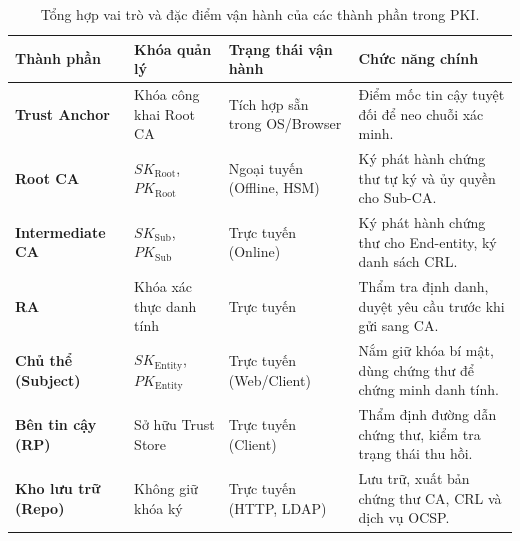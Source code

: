 \begin{table}[!htbp]
\centering
\small
\renewcommand{\arraystretch}{1.25}
\begin{tabularx}{\textwidth}{>{\raggedright\arraybackslash}p{2.6cm}>{\raggedright\arraybackslash}p{3.1cm}>{\raggedright\arraybackslash}p{2.7cm}>{\raggedright\arraybackslash}X}
\toprule
\textbf{Thành phần} & \textbf{Khóa quản lý} & \textbf{Trạng thái vận hành} & \textbf{Chức năng chính} \\
\midrule
\textbf{Trust Anchor} & Khóa công khai Root CA & Tích hợp sẵn trong OS/Browser & Điểm mốc tin cậy tuyệt đối để neo chuỗi xác minh. \\
\midrule
\textbf{Root CA} & $SK_{\mathrm{Root}}$, $PK_{\mathrm{Root}}$ & Ngoại tuyến (Offline, HSM) & Ký phát hành chứng thư tự ký và ủy quyền cho Sub-CA. \\
\midrule
\textbf{Intermediate CA} & $SK_{\mathrm{Sub}}$, $PK_{\mathrm{Sub}}$ & Trực tuyến (Online) & Ký phát hành chứng thư cho End-entity, ký danh sách CRL. \\
\midrule
\textbf{RA} & Khóa xác thực danh tính & Trực tuyến & Thẩm tra định danh, duyệt yêu cầu trước khi gửi sang CA. \\
\midrule
\textbf{Chủ thể (Subject)} & $SK_{\mathrm{Entity}}$, $PK_{\mathrm{Entity}}$ & Trực tuyến (Web/Client) & Nắm giữ khóa bí mật, dùng chứng thư để chứng minh danh tính. \\
\midrule
\textbf{Bên tin cậy (RP)} & Sở hữu Trust Store & Trực tuyến (Client) & Thẩm định đường dẫn chứng thư, kiểm tra trạng thái thu hồi. \\
\midrule
\textbf{Kho lưu trữ (Repo)} & Không giữ khóa ký & Trực tuyến (HTTP, LDAP) & Lưu trữ, xuất bản chứng thư CA, CRL và dịch vụ OCSP. \\
\bottomrule
\end{tabularx}
\caption{Tổng hợp vai trò và đặc điểm vận hành của các thành phần trong PKI.}
\label{tab:pki-components-summary}
\end{table}
